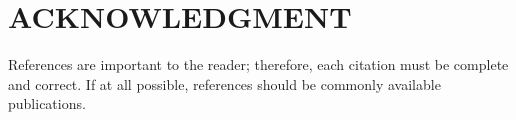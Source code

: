 \documentclass[letterpaper, 10 pt, conference]{ieeeconf}  %
\begin{document}
\section*{ACKNOWLEDGMENT}





References are important to the reader; therefore, each citation must be complete and correct. If at all possible, references should be commonly available publications.








\end{document}
